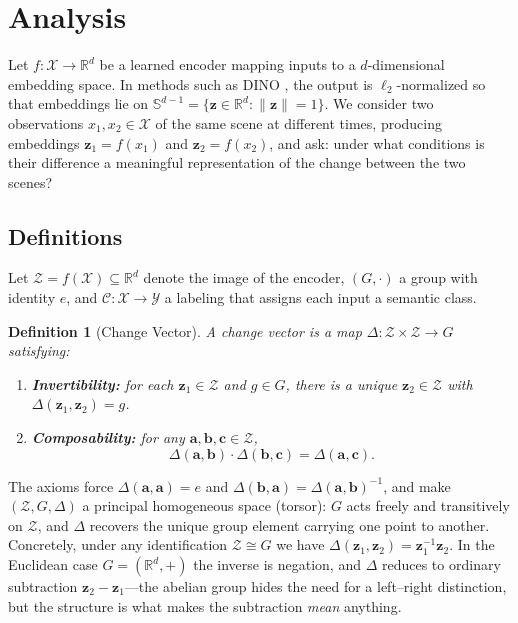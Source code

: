 \documentclass{article}
\newtheorem{definition}{Definition}
\newcommand{\vect}[1]{\mathbf{#1}}
\newcommand{\R}{\mathbb{R}}
\newcommand{\Sph}{\mathbb{S}}
\begin{document}
\section{Analysis}
\label{sec:analysis}

Let $f : \mathcal{X} \to \R^d$ be a learned encoder mapping inputs to a $d$-dimensional embedding space. In methods such as DINO \citep{caron2021emerging}, the output is $\ell_2$-normalized so that embeddings lie on $\Sph^{d-1} = \{ \vect{z} \in \R^d : \|\vect{z}\| = 1 \}$. We consider two observations $x_1, x_2 \in \mathcal{X}$ of the same scene at different times, producing embeddings $\vect{z}_1 = f(x_1)$ and $\vect{z}_2 = f(x_2)$, and ask: under what conditions is their difference a meaningful representation of the change between the two scenes?

\subsection{Definitions}

Let $\mathcal{Z} = f(\mathcal{X}) \subseteq \R^d$ denote the image of the encoder, $(G, \cdot)$ a group with identity $e$, and $\mathcal{C} : \mathcal{X} \to \mathcal{Y}$ a labeling that assigns each input a semantic class.

\begin{definition}[Change Vector]
\label{def:change_vector}
A \emph{change vector} is a map $\Delta : \mathcal{Z} \times \mathcal{Z} \to G$ satisfying:
\begin{enumerate}
    \item[(i)] \textbf{Invertibility:} for each $\vect{z}_1 \in \mathcal{Z}$ and $g \in G$, there is a unique $\vect{z}_2 \in \mathcal{Z}$ with $\Delta(\vect{z}_1, \vect{z}_2) = g$.
    \item[(ii)] \textbf{Composability:} for any $\vect{a}, \vect{b}, \vect{c} \in \mathcal{Z}$,
    \[
        \Delta(\vect{a}, \vect{b}) \cdot \Delta(\vect{b}, \vect{c}) = \Delta(\vect{a}, \vect{c}).
    \]
\end{enumerate}
\end{definition}

\noindent The axioms force $\Delta(\vect{a}, \vect{a}) = e$ and $\Delta(\vect{b}, \vect{a}) = \Delta(\vect{a}, \vect{b})^{-1}$, and make $(\mathcal{Z}, G, \Delta)$ a principal homogeneous space (torsor): $G$ acts freely and transitively on $\mathcal{Z}$, and $\Delta$ recovers the unique group element carrying one point to another. Concretely, under any identification $\mathcal{Z} \cong G$ we have $\Delta(\vect{z}_1, \vect{z}_2) = \vect{z}_1^{-1} \vect{z}_2$. In the Euclidean case $G = (\R^d, +)$ the inverse is negation, and $\Delta$ reduces to ordinary subtraction $\vect{z}_2 - \vect{z}_1$---the abelian group hides the need for a left--right distinction, but the structure is what makes the subtraction \emph{mean} anything.
\end{document}
